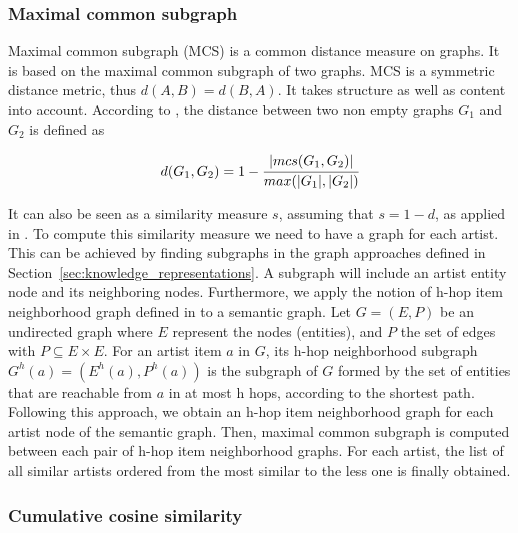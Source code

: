 \subsubsection{Maximal common subgraph}\label{sec:method:sim:mcs} %

Maximal common subgraph (MCS) is a common distance measure on graphs. It is based on the maximal common subgraph of two graphs. MCS is a symmetric distance metric, thus $d(A,B)=d(B,A)$. It takes structure as well as content into account. According to \cite{Bunke1998}, the distance between two non empty graphs $G_{1}$ and $G_{2}$ is defined as

\begin{equation}
d(G_{1},G_{2}) = 1 - \cfrac{| mcs(G_{1},G_{2}) |}{max(|G_{1}|,|G_{2}|)}
\end{equation}

It can also be seen as a similarity measure $s$, assuming that $s=1-d$, as applied in \cite{Lux2005}. To compute this similarity measure we need to have a graph for each artist. This can be achieved by finding subgraphs in the graph approaches defined in Section~\ref{sec:knowledge_representations}. A subgraph will include an artist entity node and its neighboring nodes.
Furthermore, we apply the notion of h-hop item neighborhood graph defined in \cite{ODMD14a} to a semantic graph. Let $G=(E,P)$ be an undirected graph where $E$ represent the nodes (entities), and $P$ the set of edges with $P \subseteq E \times E$. For an artist item $a$ in $G$, its h-hop neighborhood subgraph $G^{h}(a)=(E^{h}(a),P^{h}(a))$ is the subgraph of $G$ formed by the set of entities that are reachable from $a$ in at most h hops, according to the shortest path. %
Following this approach, we obtain an h-hop item neighborhood graph for each artist node of the semantic graph. Then, maximal common subgraph is computed between each pair of h-hop item neighborhood graphs. For each artist, the list of all similar artists ordered from the most similar to the less one is finally obtained.

\subsubsection{Cumulative cosine similarity} %

